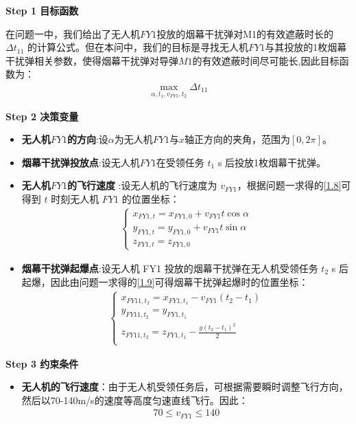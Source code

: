 \documentclass[../main.tex]{subfiles}
\begin{document}
\noindent \textbf{Step 1 目标函数}
\par 在问题一中，我们给出了无人机$FY1$投放的烟幕干扰弹对M1的有效遮蔽时长的$\Delta t_{11}$ 的计算公式。但在本问中，我们的目标是寻找无人机$FY1$与其投放的1枚烟幕干扰弹相关参数，使得烟幕干扰弹对导弹$M1$的有效遮蔽时间尽可能长,因此目标函数为：
\begin{align}\label{10.1}
  \underset{\alpha ,t_1,v_{FY1},t_2}{\max}\Delta t_{11}
\end{align}



\noindent \textbf{Step 2 决策变量}

\begin{itemize}
\item \textbf{无人机$FY1$的方向}:设$\alpha $为无人机$FY1$与$x$轴正方向的夹角，范围为$\left[ 0,2\pi \right] $。
\item \textbf{烟幕干扰弹投放点}:设无人机$FY1$在受领任务 \( t_1 \) s 后投放1枚烟幕干扰弹。
\item  \textbf{无人机$FY1$的飞行速度} :设无人机的飞行速度为 \( v_{FY1} \)，根据问题一求得的\eqref{1.8}可得到 \( t \) 时刻无人机 \( FY1 \) 的位置坐标：
\begin{align}\label{10.3}
\begin{cases}
x_{FY1,t} = x_{FY1,0} + v_{FY1} t \cos\alpha \\
y_{FY1,t} = y_{FY1,0} + v_{FY1} t \sin\alpha \\
z_{FY1,t} = z_{FY1,0}
\end{cases}
\end{align}
\item \textbf{烟幕干扰弹起爆点}:设无人机 FY1 投放的烟幕干扰弹在无人机受领任务 \( t_2 \) s 后起爆，因此由问题一求得的\eqref{1.9}可得烟幕干扰弹起爆时的位置坐标：
\begin{align}\label{10.4}
    \left\{ \begin{array}{l}
	x_{FY11,t_2}=x_{FY1,t_1}-v_{FY1}\left( t_2-t_1 \right)\\
	y_{FY11,t_2}=y_{FY1,t_1}\\
	z_{FY11,t_2}=z_{FY1,t_1}-\frac{g\left( t_2-t_1 \right) ^2}{2}\\
\end{array} \right. 
\end{align}
\end{itemize}

\noindent \textbf{Step 3 约束条件}
\begin{itemize}
\item \textbf{无人机的飞行速度}：由于无人机受领任务后，可根据需要瞬时调整飞行方向，然后以70-140m/s的速度等高度匀速直线飞行。因此：
\begin{align}\label{10.8}
  70 \leq v_{FY1} \leq 140
\end{align}
\end{itemize}
\end{document}
